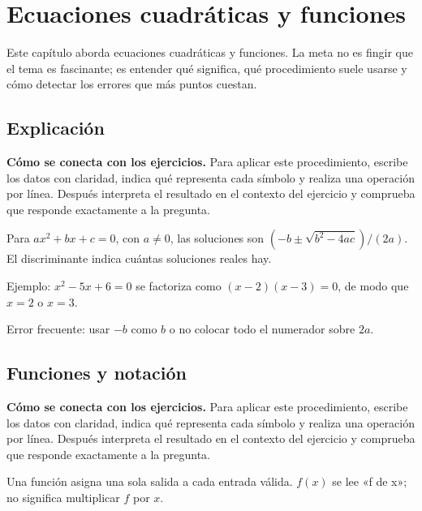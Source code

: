 \documentclass[10pt,oneside,openany]{book}
\begin{document}
\chapter{Ecuaciones cuadráticas y funciones}

\begin{idea}
Este capítulo aborda ecuaciones cuadráticas y funciones. La meta no es fingir que el tema es fascinante; es entender qué significa, qué procedimiento suele usarse y cómo detectar los errores que más puntos cuestan.
\end{idea}

\section{Explicación}

\textbf{Cómo se conecta con los ejercicios.} Para aplicar este procedimiento, escribe los datos con claridad, indica qué representa cada símbolo y realiza una operación por línea. Después interpreta el resultado en el contexto del ejercicio y comprueba que responde exactamente a la pregunta.

Para $ax^2+bx+c=0$, con $a\neq0$, las soluciones son $(-b\pm\sqrt{b^2-4ac})/(2a)$. El discriminante indica cuántas soluciones reales hay.



\begin{ejemplo}
Ejemplo: $x^2-5x+6=0$ se factoriza como $(x-2)(x-3)=0$, de modo que $x=2$ o $x=3$.
\end{ejemplo}

\begin{ojo}
Error frecuente: usar $-b$ como $b$ o no colocar todo el numerador sobre $2a$.
\end{ojo}



\section{Funciones y notación}

\textbf{Cómo se conecta con los ejercicios.} Para aplicar este procedimiento, escribe los datos con claridad, indica qué representa cada símbolo y realiza una operación por línea. Después interpreta el resultado en el contexto del ejercicio y comprueba que responde exactamente a la pregunta.

Una función asigna una sola salida a cada entrada válida. $f(x)$ se lee «f de x»; no significa multiplicar $f$ por $x$.
\end{document}

